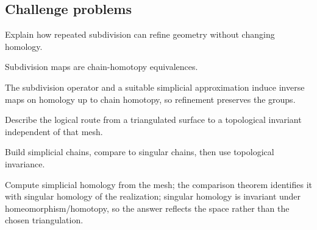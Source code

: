 \subsection*{Challenge problems}

\begin{exercise}\label{exr:viii17-ped-15}
Explain how repeated subdivision can refine geometry without changing homology.
\end{exercise}
\begin{hint}
Subdivision maps are chain-homotopy equivalences.
\end{hint}
\begin{solution}
The subdivision operator and a suitable simplicial approximation induce inverse maps on homology up to chain homotopy, so refinement preserves the groups.
\end{solution}

\begin{exercise}\label{exr:viii17-ped-16}
Describe the logical route from a triangulated surface to a topological invariant independent of that mesh.
\end{exercise}
\begin{hint}
Build simplicial chains, compare to singular chains, then use topological invariance.
\end{hint}
\begin{solution}
Compute simplicial homology from the mesh; the comparison theorem identifies it with singular homology of the realization; singular homology is invariant under homeomorphism/homotopy, so the answer reflects the space rather than the chosen triangulation.
\end{solution}

